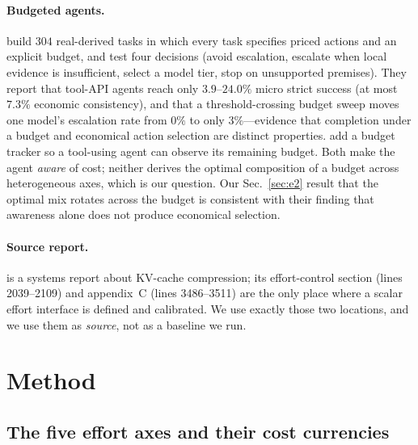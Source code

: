 \documentclass[10pt]{article} %
\begin{document}
\paragraph{Budgeted agents.}
\citet{wu2026ecoagentbench} build $304$ real-derived tasks in which every task
specifies priced actions and an explicit budget, and test four decisions
(avoid escalation, escalate when local evidence is insufficient, select a model
tier, stop on unsupported premises). They report that tool-API agents reach only
$3.9$--$24.0\%$ micro strict success (at most $7.3\%$ economic consistency), and
that a threshold-crossing budget sweep moves one model's escalation rate from
$0\%$ to only $3\%$---evidence that completion under a budget and economical
action selection are distinct properties. \citet{liu2025budgettooluse} add a
budget tracker so a tool-using agent can observe its remaining budget. Both make
the agent \emph{aware} of cost; neither derives the optimal composition of a
budget across heterogeneous axes, which is our question. Our
Sec.~\ref{sec:e2} result that the optimal mix rotates across the budget is
consistent with their finding that awareness alone does not produce economical
selection.

\paragraph{Source report.}
\citet{v41flash2026} is a systems report about KV-cache compression; its
effort-control section (lines 2039--2109) and appendix~C (lines 3486--3511) are
the only place where a scalar effort interface is defined and calibrated. We use
exactly those two locations, and we use them as \emph{source}, not as a baseline
we run.

\section{Method}
\label{sec:method}

\subsection{The five effort axes and their cost currencies}
\end{document}
